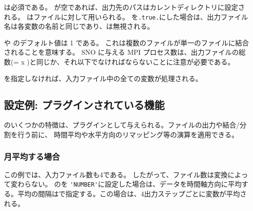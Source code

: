 は必須である。
が空であれば、出力先のパスはカレントディレクトリに設定される。
は\scalenetcdf ファイルに対して用いられる。
 を\verb|.true.|にした場合は、出力ファイル名は各変数の名前と同じであり、は無視される。

 や  のデフォルト値は 1 である。
これは複数のファイルが単一のファイルに結合されることを意味する。
SNO に与える MPI プロセス数は、出力ファイルの総数(=  x )と同じか、それ以下でなければならないことに注意が必要である。

を指定しなければ、入力ファイル中の全ての変数が処理される。


\subsection{設定例: プラグインされている機能}

\sno のいくつかの特徴は、プラグインとして与えられる。ファイルの出力や結合/分割を行う前に、
時間平均や水平方向のリマッピング等の演算を適用できる。

\subsubsection{月平均する場合}


この例では、入力ファイル数も4である。
したがって、ファイル数は変換によって変わらない。
 のを \verb|'NUMBER'|に設定した場合は、データを時間軸方向に平均する。平均の間隔はで指定する。この場合は、4出力ステップごとに変数が平均される。

